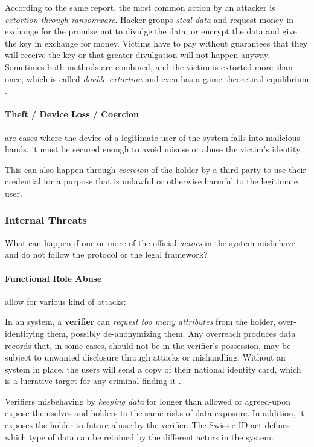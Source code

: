 According to the same report, the most common action by an attacker is \emph{extortion through ransomware}.
Hacker groups \emph{steal data} and request money in exchange for the promise not to divulge the data,
or encrypt the data and give the key in exchange for money.
Victims have to pay without guarantees that they will receive the key or that greater divulgation will not happen anyway.
Sometimes both methods are combined, and the victim is extorted more than once, which is called \emph{double extortion}
and even has a game-theoretical equilibrium \cite{Meurs24}.

\paragraph{Theft / Device Loss / Coercion} are cases where the device of a legitimate user of the system falls into malicious hands, it must be secured enough to avoid misuse or abuse the victim's identity.

This can also happen through \emph{coercion} of the holder by a third party to use their
credential for a purpose that is unlawful or otherwise harmful to the legitimate user.

\subsubsection{Internal Threats}
\label{p:internal-threats}

What can happen if one or more of the official \emph{actors} in the \eid system
misbehave and do not follow the protocol or the legal framework?

\paragraph{Functional Role Abuse} allow for various kind of attacks: 

In an \eid system, a \textbf{verifier} can \emph{request too many attributes} 
from the holder, over-identifying them, possibly de-anonymizing them. 
Any overreach produces data records that, in some cases, should not be in the verifier’s possession, may be subject to unwanted disclosure through attacks or mishandling.
Without an \eid system in place, the users will send a copy of their national identity card, which is a lucrative target for any criminal finding it \cite{Tea25}.

Verifiers misbehaving by \emph{keeping data} for longer than allowed or agreed-upon expose themselves and holders to the same risks of data exposure. 
In addition, it exposes the holder to future abuse by the verifier.
The Swiss e-ID act defines which type of data can be retained by the different actors in the system.


